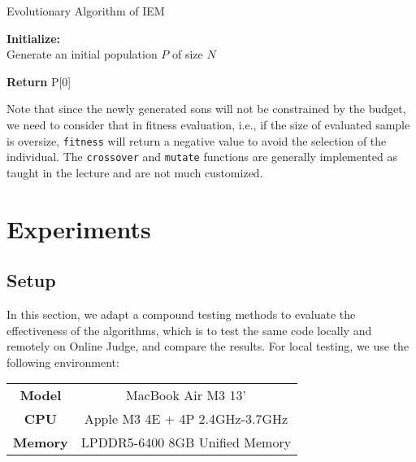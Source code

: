 \documentclass{article}
\begin{document}
\begin{algorithm}[H]
\caption{Evolutionary Algorithm of IEM}\label{alg:evolutionary}

\textbf{Initialize:} \\
Generate an initial population $P$ of size $N$\;

\textbf{Return} P[0]\;
\end{algorithm}

Note that since the newly generated sons will not be constrained by the budget, we need to consider that in fitness evaluation, i.e., if the size of evaluated sample is oversize, \texttt{fitness} will return a negative value to avoid the selection of the individual. The \texttt{crossover} and \texttt{mutate} functions are generally implemented as taught in the lecture and are not much customized.

\section{Experiments}
\subsection{Setup}
In this section, we adapt a compound testing methods to evaluate the effectiveness of the algorithms, which is to test the same code locally and remotely on Online Judge, and compare the results. For local testing, we use the following environment:
\begin{table}[!htbp]
    \begin{center}
    \begin{tabular}[c]{cc}
        \textbf{Model} & MacBook Air M3 13' \\
        \textbf{CPU} & Apple M3 4E + 4P 2.4GHz-3.7GHz \\
        \textbf{Memory} & LPDDR5-6400 8GB Unified Memory
    \end{tabular}
    \end{center}
\end{table}
\end{document}
